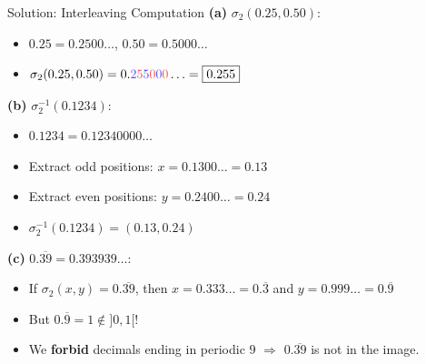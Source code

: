 \documentclass[aspectratio=169]{beamer}
\begin{document}
\begin{frame}{Solution: Interleaving Computation}
\textbf{(a)} $\sigma_2(0.25, 0.50)$:
\begin{itemize}
    \item $0.25 = 0.2500\ldots$, \quad $0.50 = 0.5000\ldots$
    \item $\sigma_2(0.25, 0.50) = 0.\textcolor{blue!70}{2}\textcolor{red!70}{5}\textcolor{blue!70}{5}\textcolor{red!70}{0}\textcolor{blue!70}{0}\textcolor{red!70}{0}\ldots = \boxed{0.255}$
\end{itemize}

\vspace{0.3cm}
\textbf{(b)} $\sigma_2^{-1}(0.1234)$:
\begin{itemize}
    \item $0.1234 = 0.12340000\ldots$
    \item Extract odd positions: $x = 0.1300\ldots = 0.13$
    \item Extract even positions: $y = 0.2400\ldots = 0.24$
    \item $\sigma_2^{-1}(0.1234) = \boxed{(0.13, 0.24)}$
\end{itemize}

\vspace{0.3cm}
\textbf{(c)} $0.\overline{39} = 0.393939\ldots$:
\begin{itemize}
    \item If $\sigma_2(x, y) = 0.\overline{39}$, then $x = 0.333\ldots = 0.\overline{3}$ and $y = 0.999\ldots = 0.\overline{9}$
    \item But $0.\overline{9} = 1 \notin ]0,1[$!
    \item We \textbf{forbid} decimals ending in periodic $9$ $\Rightarrow$ $0.\overline{39}$ is not in the image.
\end{itemize}
\end{frame}
\end{document}
